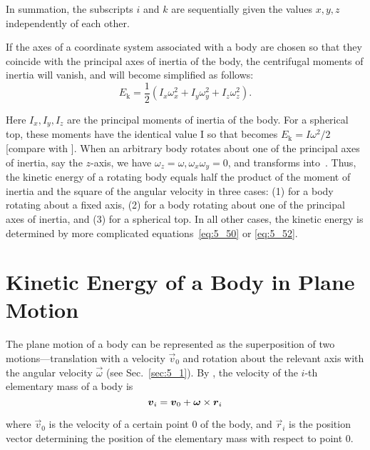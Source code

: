 \noindent
In summation, the subscripts $i$ and $k$ are sequentially given the values $x, y, z$ independently of each other.

If the axes of a coordinate system associated with a body are chosen so that they coincide with the principal axes of inertia of the body, the centrifugal moments of inertia will vanish, and  will become simplified as follows:
\begin{equation}\label{eq:5_52}
	E_{\text{k}} = \frac{1}{2}(I_x\omega_x^2 + I_y\omega_y^2 + I_z\omega_z^2).
\end{equation}

\noindent
Here $I_x, I_y, I_z$ are the principal moments of inertia of the body. For a spherical top, these moments have the identical value I so that  becomes $E_{\text{k}}=I\omega^2/2$ [compare with ]. When an arbitrary body rotates about one of the principal axes of inertia, say the $z$-axis, we have $\omega_z=\omega, \omega_x\omega_y=0$, and  transforms into~. Thus, the kinetic energy of a rotating body equals half the product of the moment of inertia and the square of the angular velocity in three cases: (1) for a body rotating about a fixed axis, (2) for a body rotating about one of the principal axes of inertia, and (3) for a spherical top. In all other cases, the kinetic energy is determined by more complicated equations~\eqref{eq:5_50} or \eqref{eq:5_52}.

\section{Kinetic Energy of a Body in Plane Motion}\label{sec:5_7}

\vspace{-5pt}

The plane motion of a body can be represented as the superposition of two mo\-tions---translation with a velocity $\vec{v}_0$ and rotation about the relevant axis with the angular velocity $\vec{\omega}$ (see Sec.~\ref{sec:5_1}). By , the velocity of the $i$-th elementary mass of a body is
\begin{equation*}
	\boldsymbol{v}_i = \boldsymbol{v}_0 + \boldsymbol{\omega}\times\boldsymbol{r}_i
\end{equation*}

\noindent
where $\vec{v}_0$ is the velocity of a certain point $0$ of the body, and $\vec{r}_i$ is the position vector determining the position of the elementary mass with respect to point $0$.

